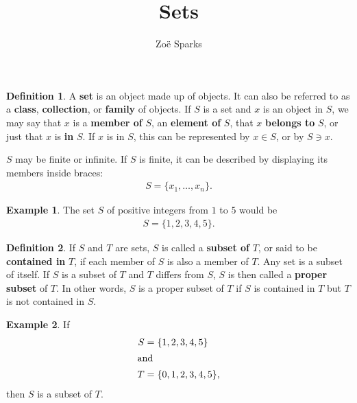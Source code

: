 \documentclass[12pt]{article}
\title{Sets}
\author{Zoë Sparks}
\begin{document}
\theoremstyle{definition}

\newtheorem{thm}{Theorem}
\newtheorem*{nthm}{Theorem}
\newtheorem{sthm}{}[thm]
\newtheorem{lemma}{Lemma}[thm]
\newtheorem*{nlemma}{Lemma}
\newtheorem{cor}{Corollary}[thm]
\newtheorem*{prop}{Property}
\newtheorem*{defn}{Definition}
\newtheorem*{comm}{Comment}
\newtheorem*{exm}{Example}

\maketitle

\begin{defn}
  A \textbf{set} is an object made up of objects. It can also be referred to as a
  \textbf{class}, \textbf{collection}, or \textbf{family} of objects. If $S$ is a set
  and $x$ is an object in $S$, we may say that $x$ is a \textbf{member of} $S$, an
  \textbf{element of} $S$, that $x$ \textbf{belongs to} $S$, or just that $x$ is
  \textbf{in} $S$. If $x$ is in $S$, this can be represented by $x \in S$, or by $S
  \ni x$.

  $S$ may be finite or infinite. If $S$ is finite, it can be described by displaying
  its members inside braces:
  \begin{align*}
    S = \{x_1,\ldots,x_n\}.
  \end{align*}
\end{defn}

\begin{exm}
  The set $S$ of positive integers from $1$ to $5$ would be
  \begin{align*}
    S = \{1,2,3,4,5\}.
  \end{align*}
\end{exm}

\begin{defn}
  If $S$ and $T$ are sets, $S$ is called a \textbf{subset of} $T$, or said to be
  \textbf{contained in} $T$, if each member of $S$ is also a member of $T$. Any set
  is a subset of itself. If $S$ is a subset of $T$ and $T$ differs from $S$, $S$ is
  then called a \textbf{proper subset} of $T$. In other words, $S$ is a proper subset
  of $T$ if $S$ is contained in $T$ but $T$ is not contained in $S$.
\end{defn}

\begin{exm}
  If
  \begin{align*}
    S &= \{1,2,3,4,5\}\\
    \shortintertext{and}
    T &= \{0,1,2,3,4,5\},
  \end{align*}
  then $S$ is a subset of $T$.
\end{exm}
\end{document}
